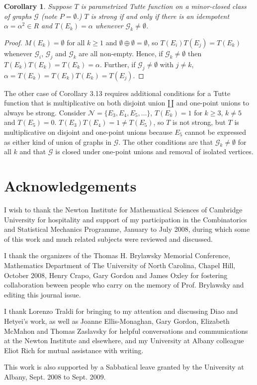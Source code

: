 \documentclass[12pt,leqno]{amsart}
\newtheorem{cor}[lem]{Corollary}
\theoremstyle{remark}
\begin{document}
\begin{cor}
Suppose $T$ is parametrized Tutte function on a minor-closed class
of graphs $\mathcal{G}$ (note $P=\emptyset$.)  
$T$ is strong if and only if 
there is an idempotent $\alpha=\alpha^2\in R$ and $T(E_k)=\alpha$
whenever $\mathcal{G}_k\neq\emptyset$.
\end{cor}

\begin{proof}
$M(E_k)=\emptyset$ for all $k\geq 1$ and 
$\emptyset\oplus\emptyset=\emptyset$, so 
$T(E_i)T(E_j)=T(E_k)$ whenever $\mathcal{G}_i$,
$\mathcal{G}_j$ and 
$\mathcal{G}_k$ are all non-empty.  Hence, if
$\mathcal{G}_k\neq\emptyset$ then $T(E_k)T(E_k)=T(E_k)=\alpha$.
Further, if $\mathcal{G}_j\neq\emptyset$ with $j\neq k$,
$\alpha=T(E_k)=T(E_k)T(E_k)=T(E_j)$.
\end{proof}

The other case of Corollary 3.13 \cite{Ellis-Monaghan-Traldi} requires
additional conditions for a Tutte function that is multiplicative on
both disjoint union $\amalg$ and one-point unions  to always
be strong.  Consider $\mathcal{N}=\{E_3, E_4, E_5,  \ldots \}$,
$T(E_k)=1$ for $k\geq 3$, $k\neq 5$ and 
$T(E_5)=0$.  $T(E_3)T(E_4)=1\neq T(E_5)$, so 
$T$ is not strong, but $T$ is multiplicative
on disjoint and one-point unions because $E_5$ cannot be expressed
as either kind of union of graphs in $\mathcal{G}$.  The other conditions
are that $\mathcal{G}_k\neq\emptyset$ for all $k$ and that 
$\mathcal{G}$ is closed under one-point unions and removal of isolated
vertices.

\section{Acknowledgements}

I wish to thank the Newton Institute for Mathematical Sciences
of Cambridge University for hospitality and support of my
participation in the Combinatorics and Statistical Mechanics
Programme, January to July 2008, during which some of this
work and much related subjects were reviewed and discussed.

I thank the organizers of 
the Thomas H. Brylawsky Memorial Conference, Mathematics Department of
The University of North Carolina, Chapel Hill, October 2008, 
Henry Crapo, Gary Gordon and James Oxley
for
fostering collaboration beween people who carry
on the memory of Prof. Brylawsky and editing this journal
issue.  

I thank Lorenzo Traldi for bringing to my attention and
discussing Diao and Hetyei's work, as well as
Joanne Ellis-Monaghan, Gary Gordon, Elizabeth McMahon
and Thomas Zaslavsky for helpful conversations and communications
at the Newton Institute and elsewhere, and
my University at Albany colleague Eliot Rich for mutual assistance with
writing.

This work is also supported by a Sabbatical leave granted
by the University at Albany, Sept. 2008 to Sept. 2009.





\end{document}
